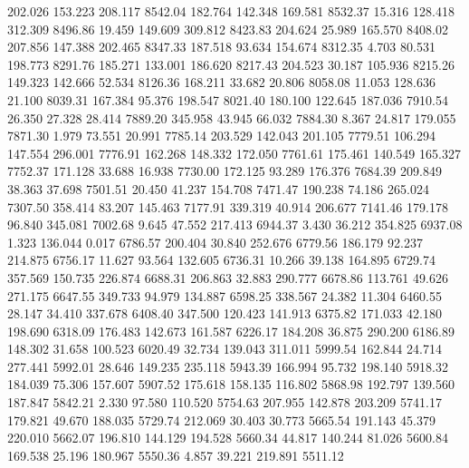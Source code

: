  202.026  153.223  208.117      8542.04
 182.764  142.348  169.581      8532.37
  15.316  128.418  312.309      8496.86
  19.459  149.609  309.812      8423.83
 204.624   25.989  165.570      8408.02
 207.856  147.388  202.465      8347.33
 187.518   93.634  154.674      8312.35
   4.703   80.531  198.773      8291.76
 185.271  133.001  186.620      8217.43
 204.523   30.187  105.936      8215.26
 149.323  142.666   52.534      8126.36
 168.211   33.682   20.806      8058.08
  11.053  128.636   21.100      8039.31
 167.384   95.376  198.547      8021.40
 180.100  122.645  187.036      7910.54
  26.350   27.328   28.414      7889.20
 345.958   43.945   66.032      7884.30
   8.367   24.817  179.055      7871.30
   1.979   73.551   20.991      7785.14
 203.529  142.043  201.105      7779.51
 106.294  147.554  296.001      7776.91
 162.268  148.332  172.050      7761.61
 175.461  140.549  165.327      7752.37
 171.128   33.688   16.938      7730.00
 172.125   93.289  176.376      7684.39
 209.849   38.363   37.698      7501.51
  20.450   41.237  154.708      7471.47
 190.238   74.186  265.024      7307.50
 358.414   83.207  145.463      7177.91
 339.319   40.914  206.677      7141.46
 179.178   96.840  345.081      7002.68
   9.645   47.552  217.413      6944.37
   3.430   36.212  354.825      6937.08
   1.323  136.044    0.017      6786.57
 200.404   30.840  252.676      6779.56
 186.179   92.237  214.875      6756.17
  11.627   93.564  132.605      6736.31
  10.266   39.138  164.895      6729.74
 357.569  150.735  226.874      6688.31
 206.863   32.883  290.777      6678.86
 113.761   49.626  271.175      6647.55
 349.733   94.979  134.887      6598.25
 338.567   24.382   11.304      6460.55
  28.147   34.410  337.678      6408.40
 347.500  120.423  141.913      6375.82
 171.033   42.180  198.690      6318.09
 176.483  142.673  161.587      6226.17
 184.208   36.875  290.200      6186.89
 148.302   31.658  100.523      6020.49
  32.734  139.043  311.011      5999.54
 162.844   24.714  277.441      5992.01
  28.646  149.235  235.118      5943.39
 166.994   95.732  198.140      5918.32
 184.039   75.306  157.607      5907.52
 175.618  158.135  116.802      5868.98
 192.797  139.560  187.847      5842.21
   2.330   97.580  110.520      5754.63
 207.955  142.878  203.209      5741.17
 179.821   49.670  188.035      5729.74
 212.069   30.403   30.773      5665.54
 191.143   45.379  220.010      5662.07
 196.810  144.129  194.528      5660.34
  44.817  140.244   81.026      5600.84
 169.538   25.196  180.967      5550.36
   4.857   39.221  219.891      5511.12
